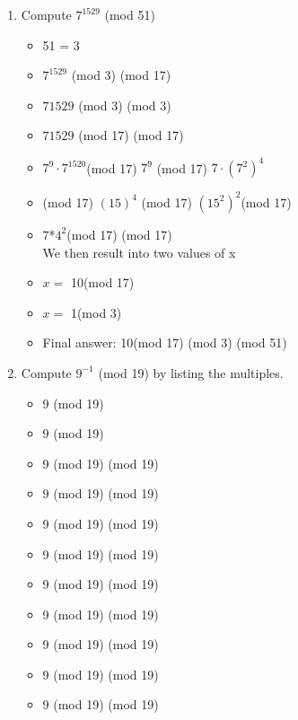 \documentclass[11pt]{article}
\newcounter{prnum}
\newenvironment{problem}{{\vskip 0.2in\noindent\bf Problem
       \addtocounter{prnum}{1} \arabic{prnum}.}}{\vskip 0.1in}
\begin{document}
\begin{problem}
  \begin{enumerate}
    \item Compute $7^{1529}$ (mod 51)
      \begin{itemize}
        \item 51 = 3
        \item $7^{1529}$ (mod 3) (mod 17)
        \item $7{1529}$ (mod 3) (mod 3)
        \item $7{1529}$ (mod 17) (mod 17)
        \item $7^9 \cdot 7^{1520}$(mod 17) \equiv $7^9$ (mod 17)  \cdot $7\cdot(7^2)^4$
        \item {}(mod 17) $(15)^4$ (mod 17) \cdot$(15^2)^2$(mod 17)
        \item 7*$4^2$(mod 17) (mod 17)\\
          We then result into two values of x
        \item $x =$ 10(mod 17)
        \item $x =$ 1(mod 3)
        \item Final answer: 10(mod 17) (mod 3) (mod 51)
      \end{itemize}
    \item Compute $9^{-1}$ (mod 19) by listing the multiples.
      \begin{itemize}
        \item 9  (mod 19)
        \item 9   (mod 19)
        \item 9   (mod 19)  (mod 19)
        \item 9   (mod 19)  (mod 19)
        \item 9   (mod 19)  (mod 19)
        \item 9   (mod 19)  (mod 19)
        \item 9   (mod 19)  (mod 19)
        \item 9   (mod 19)  (mod 19)
        \item 9   (mod 19)  (mod 19)
        \item 9   (mod 19)  (mod 19)
        \item 9   (mod 19)  (mod 19)

\end{itemize}
\end{enumerate}
\end{problem}
\end{document}
